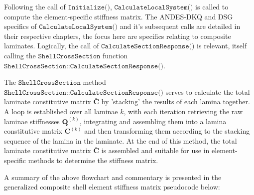 Following the call of $\texttt{Initialize()}$, $\texttt{CalculateLocalSystem()}$ is called to compute the element-specific stiffness matrix. The ANDES-DKQ and DSG specifics of $\texttt{CalculateLocalSystem()}$ and it's subsequent calls are detailed in their respective chapters, the focus here are specifics relating to composite laminates. Logically, the call of $\texttt{CalculateSectionResponse()}$ is relevant, itself calling the $\texttt{ShellCrossSection}$ function $\texttt{ShellCrossSection::CalculateSectionResponse()}$.

The $\texttt{ShellCrossSection}$ method $\texttt{ShellCrossSection::CalculateSectionResponse()}$ serves to calculate the total laminate constitutive matrix $\bar{\mathbf{C}}$ by 'stacking' the results of each lamina together. A loop is established over all laminae $k$, with each iteration retrieving the raw laminae stiffnesses $\mathbf{Q}^{(k)}$, integrating and assembling them into a lamina constitutive matrix $\mathbf{C}^{(k)}$ and then transforming them according to the stacking sequence of the lamina in the laminate. At the end of this method, the total laminate constitutive matrix $\bar{\mathbf{C}}$ is assembled and suitable for use in element-specific methods to determine the stiffness matrix. 

A summary of the above flowchart and commentary is presented in the generalized composite shell element stiffness matrix pseudocode below:


